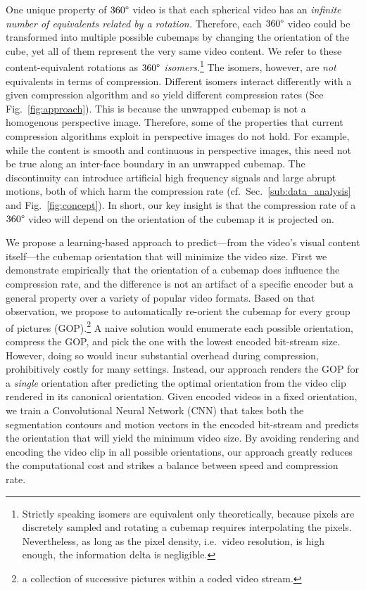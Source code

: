 \documentclass[journal,transmag]{IEEEtran}
\begin{document}
 
One unique property of $360\degree$ video is that each spherical video has an \emph{infinite number of equivalents related by a rotation.}
Therefore,
each $360\degree$ video could be transformed into multiple possible cubemaps by changing the orientation of the cube, yet all of them represent the very same video content.
We refer to these content-equivalent rotations as \emph{$360\degree$ isomers}.\footnote{Strictly speaking isomers are equivalent only theoretically, because pixels are discretely sampled and rotating a cubemap requires interpolating the pixels.  Nevertheless, as long as the pixel density, i.e.~video resolution, is high enough, the information delta is negligible.}
The isomers, however, are \emph{not} equivalents in terms of compression.  Different isomers interact differently with a given compression algorithm and so yield different compression rates (See Fig.~\ref{fig:approach}).
This is because the unwrapped cubemap is not a homogenous perspective image.
Therefore, some of the properties that current compression algorithms exploit in perspective images do not hold.
For example, while the content is smooth and continuous in perspective images,
this need not be true along an inter-face boundary in an unwrapped cubemap.
The discontinuity can introduce artificial high frequency signals and large abrupt motions,
both of which harm the compression rate (cf.~Sec.~\ref{sub:data_analysis} and Fig.~\ref{fig:concept}).
In short, our key insight is that the compression rate of a $360\degree$ video will depend on the orientation of the cubemap it is projected on.

We propose a learning-based approach to predict---from the video's visual content itself---the cubemap orientation that will minimize the video size.
First we demonstrate empirically that the orientation of a cubemap does influence the compression rate,
and the difference is not an artifact of a specific encoder but a general property over a variety of popular video formats.
Based on that observation,
we propose to automatically re-orient the cubemap for every group of pictures (GOP).\footnote{a collection of successive pictures within a coded video stream.}
A naive solution would enumerate each possible orientation, compress the GOP, and pick the one with the lowest encoded bit-stream size.
However, doing so would incur substantial overhead during compression, prohibitively costly for many settings.
Instead, our approach renders the GOP for a \emph{single} orientation after predicting the optimal orientation from the video clip rendered in its canonical orientation.
Given encoded videos in a fixed orientation,
we train a Convolutional Neural Network (CNN) that takes both the 
segmentation contours and motion vectors
in the encoded bit-stream and predicts the orientation that will yield the minimum video size.
By avoiding rendering and encoding the video clip in all possible orientations,
our approach greatly reduces the computational cost and strikes a balance between speed and compression rate.
\end{document}
